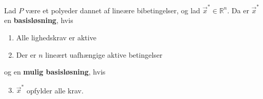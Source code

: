 
\begin{defn}[Basisløsning]
Lad $P$ være et polyeder dannet af lineære bibetingelser, og lad $\vec{x}^*\in \mathds{R}^n$. Da er $\vec{x}^*$ en \textbf{basisløsning}, hvis
\begin{enumerate}[label=(\alph*)]
\item Alle lighedskrav er aktive
\item Der er $n$ lineært uafhængige aktive betingelser
\end{enumerate}
og en \textbf{mulig basisløsning}, hvis
\begin{enumerate}[label=(\alph*)]
\setcounter{enumi}{2}
\item $\vec{x}^*$ opfylder alle krav.
\end{enumerate}
\label{def:basislosning}
\end{defn}

